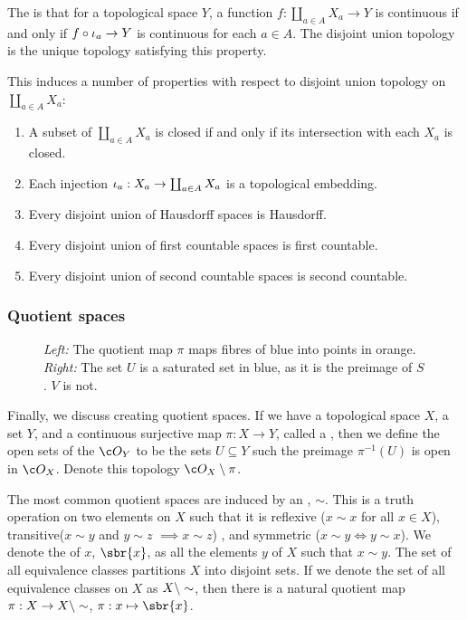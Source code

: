 The  is that for a topological space \(Y\), a function \(f: \coprod_{a\in A} X_a \to Y\) is continuous if and only if \(f\circ \iota_a \to Y\) is continuous for each \(a\in A\).
The disjoint union topology is the unique topology satisfying this property.

This induces a number of properties with respect to disjoint union topology on \(\coprod_{a\in A} X_a\): \begin{enumerate}[noitemsep] \item A subset of \(\coprod_{a\in A} X_a\) is closed if and only if its intersection with each \(X_a\) is closed.
	\item Each injection \(\iota_a: X_a \to \coprod_{a\in A}
	      X_a\) is a topological embedding.
	\item Every disjoint union of Hausdorff spaces is Hausdorff.
	\item Every disjoint union of first countable spaces is first countable.
	\item Every disjoint union of second countable spaces is second countable.
\end{enumerate}

\subsubsection{Quotient spaces}

\begin{figure}[h]
	\hfill
	\caption[short]{\emph{Left:}
		The quotient map \(\pi\) maps fibres of blue into points in orange.
		\emph{Right:}
		The set \(U\) is a saturated set in blue, as it is the preimage of \(S\).
		\(V\) is not.}
\end{figure}

Finally, we discuss creating quotient spaces.
If we have a topological space \(X\), a set \(Y\), and a continuous surjective map \(\pi: X\to Y\), called a , then we define the open sets of the  \(\topo{Y}\) to be the sets \(U \subseteq Y\) such the preimage \(\pi^{-1}(U)\) is open in \(\topo{X}\).
Denote this topology \(\topo{X}\takeaway \pi\).

The most common quotient spaces are induced by an , \(\sim\).
This is a truth operation on two elements on \(X\) such that it is reflexive (\(x\sim x\) for all \(x\in X\)), transitive(\(x\sim y\) and \(y\sim z\) \(\implies x\sim z\)) , and symmetric (\(x\sim y \iff y\sim x\)).
We denote the  of \(x\), \(\sbr{x}\), as all the elements \(y\) of \(X\) such that \(x\sim y\).
The set of all equivalence classes partitions \(X\) into disjoint sets.
If we denote the set of all equivalence classes on \(X\) as \(X\setminus \sim\), then there is a natural quotient map \(\pi: X\to X\setminus\sim\), \(\pi: x\mapsto \sbr{x}\).

